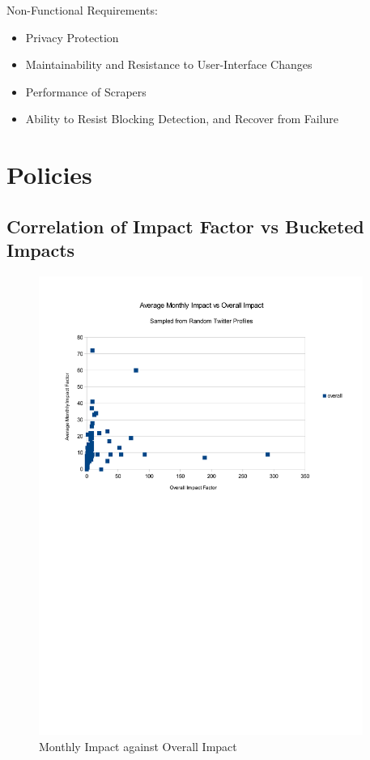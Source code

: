 Non-Functional Requirements:
\begin{itemize}
\item Privacy Protection
\item Maintainability and Resistance to User-Interface Changes
\item Performance of Scrapers
\item Ability to Resist Blocking Detection, and Recover from Failure
\end{itemize}

\section{Policies}

\subsection{Correlation of Impact Factor vs Bucketed Impacts}

\begin{figure}[h!]
\centering
\includegraphics[width=400px]{Images/monthly_impact_vs_overallv2.pdf}
\caption{Monthly Impact against Overall Impact}
\end{figure}

